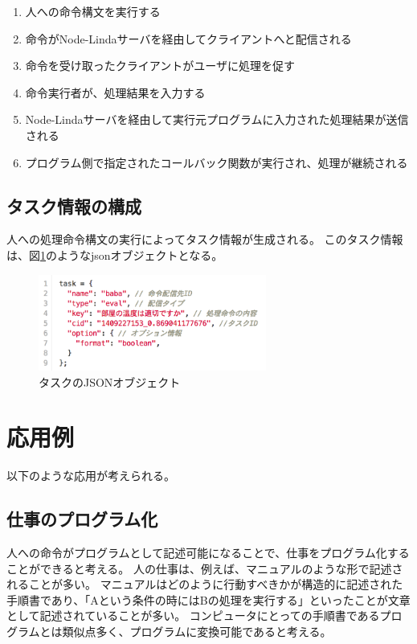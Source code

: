 \documentclass[twoside]{wiss}
\begin{document}
\begin{enumerate}
  \item 人への命令構文を実行する
  \item 命令がNode-Lindaサーバを経由してクライアントへと配信される
  \item 命令を受け取ったクライアントがユーザに処理を促す
  \item 命令実行者が、処理結果を入力する
  \item Node-Lindaサーバを経由して実行元プログラムに入力された処理結果が送信される
  \item プログラム側で指定されたコールバック関数が実行され、処理が継続される
\end{enumerate}

\subsection{タスク情報の構成}

人への処理命令構文の実行によってタスク情報が生成される。
このタスク情報は、図\ref{task}のようなjsonオブジェクトとなる。

\begin{figure}[!h]
  \includegraphics[width=75mm, bb=0 0 755 318]{./images/task.png}
  \caption{タスクのJSONオブジェクト}  
  \label{task}
\end{figure}

\section{応用例}

以下のような応用が考えられる。

\subsection{仕事のプログラム化}

人への命令がプログラムとして記述可能になることで、仕事をプログラム化することができると考える。
人の仕事は、例えば、マニュアルのような形で記述されることが多い。
マニュアルはどのように行動すべきかが構造的に記述された手順書であり、「Aという条件の時にはBの処理を実行する」といったことが文章として記述されていることが多い。
コンピュータにとっての手順書であるプログラムとは類似点多く、プログラムに変換可能であると考える。
\end{document}

